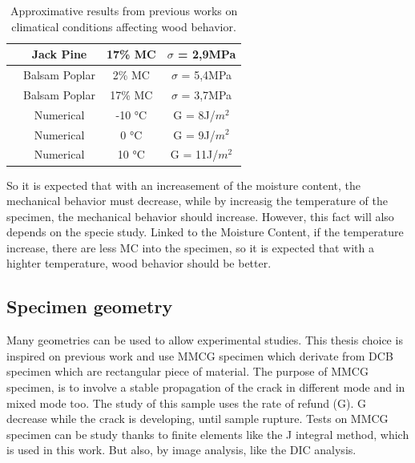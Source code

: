 \begin{table}[]
\begin{tabular}{cccc}
		\multicolumn{1}{|c|}{\cellcolor[HTML]{C6E0B4}\cite{Huang2020}} & \multicolumn{1}{c|}{Jack Pine} & \multicolumn{1}{c|}{17\% MC} & \multicolumn{1}{c|}{$\sigma$ = 2,9MPa} \\ \hline
		\multicolumn{1}{|c|}{\cellcolor[HTML]{C6E0B4}\cite{Huang2020}} & \multicolumn{1}{c|}{Balsam Poplar} & \multicolumn{1}{c|}{2\% MC} & \multicolumn{1}{c|}{$\sigma$ = 5,4MPa} \\ \hline
		\multicolumn{1}{|c|}{\cellcolor[HTML]{C6E0B4}\cite{Huang2020}} & \multicolumn{1}{c|}{Balsam Poplar} & \multicolumn{1}{c|}{17\% MC} & \multicolumn{1}{c|}{$\sigma$ = 3,7MPa} \\ \hline
		\multicolumn{1}{|c|}{\cellcolor[HTML]{F4B084}\cite{Seif2017}} & \multicolumn{1}{c|}{Numerical} & \multicolumn{1}{c|}{-10 °C} & \multicolumn{1}{c|}{G = 8J/$m^{2}$} \\ \hline
		\multicolumn{1}{|c|}{\cellcolor[HTML]{F4B084}\cite{Seif2017}} & \multicolumn{1}{c|}{Numerical} & \multicolumn{1}{c|}{0 °C} & \multicolumn{1}{c|}{G = 9J/$m^{2}$} \\ \hline
		\multicolumn{1}{|c|}{\cellcolor[HTML]{F4B084}\cite{Seif2017}} & \multicolumn{1}{c|}{Numerical} & \multicolumn{1}{c|}{10 °C} & \multicolumn{1}{c|}{G = 11J/$m^{2}$} \\ \hline
	\end{tabular}
	\caption{Approximative results from previous works on climatical conditions affecting wood behavior.}
	\label{tab:ArticleResult}
\end{table}

So it is expected that with an increasement of the moisture content, the mechanical behavior must decrease, while by increasig the temperature of the specimen, the mechanical behavior should increase. However, this fact will also depends on the specie study.
Linked to the Moisture Content, if the temperature increase, there are less MC into the specimen, so it is expected that with a highter temperature, wood behavior should be better.


\subsection{Specimen geometry}

Many geometries can be used to allow experimental studies. This thesis choice is inspired on previous work and use MMCG specimen which derivate from DCB specimen which are rectangular piece of material. The purpose of MMCG specimen, \parencite{Reference6} is to involve a stable propagation of the crack in different mode and in mixed mode too. The study of this sample uses the rate of refund (G). G decrease while the crack is developing, until sample rupture. Tests on MMCG specimen can be study thanks to finite elements like the J integral method, which is used in this work. But also, by image analysis, like the DIC analysis.


